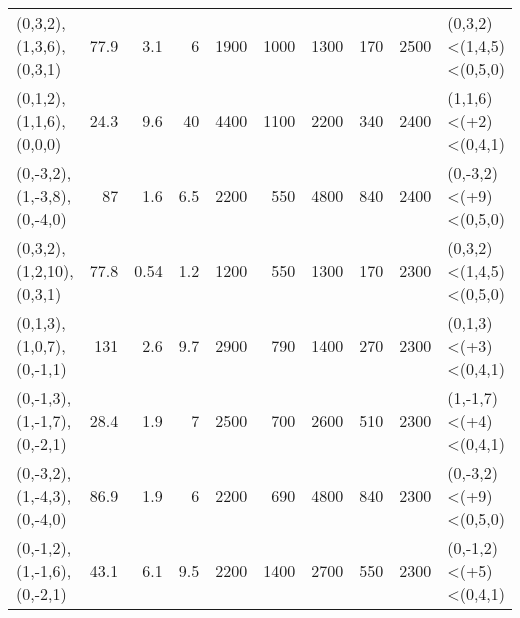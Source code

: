 \begin{tabular}{lrrrrrrrrl}
 (0,3,2),(1,3,6),(0,3,1)     &       77.9 &                              3.1  &                            6    &                              1900 &                            1000 &                              1300 &                             170 &       2500 & (0,3,2)<(1,4,5)<(0,5,0) \\
 (0,1,2),(1,1,6),(0,0,0)     &       24.3 &                              9.6  &                           40    &                              4400 &                            1100 &                              2200 &                             340 &       2400 & (1,1,6)<(+2)<(0,4,1)    \\
 (0,-3,2),(1,-3,8),(0,-4,0)  &       87   &                              1.6  &                            6.5  &                              2200 &                             550 &                              4800 &                             840 &       2400 & (0,-3,2)<(+9)<(0,5,0)   \\
 (0,3,2),(1,2,10),(0,3,1)    &       77.8 &                              0.54 &                            1.2  &                              1200 &                             550 &                              1300 &                             170 &       2300 & (0,3,2)<(1,4,5)<(0,5,0) \\
 (0,1,3),(1,0,7),(0,-1,1)    &      131   &                              2.6  &                            9.7  &                              2900 &                             790 &                              1400 &                             270 &       2300 & (0,1,3)<(+3)<(0,4,1)    \\
 (0,-1,3),(1,-1,7),(0,-2,1)  &       28.4 &                              1.9  &                            7    &                              2500 &                             700 &                              2600 &                             510 &       2300 & (1,-1,7)<(+4)<(0,4,1)   \\
 (0,-3,2),(1,-4,3),(0,-4,0)  &       86.9 &                              1.9  &                            6    &                              2200 &                             690 &                              4800 &                             840 &       2300 & (0,-3,2)<(+9)<(0,5,0)   \\
 (0,-1,2),(1,-1,6),(0,-2,1)  &       43.1 &                              6.1  &                            9.5  &                              2200 &                            1400 &                              2700 &                             550 &       2300 & (0,-1,2)<(+5)<(0,4,1)   \\

\end{tabular}
